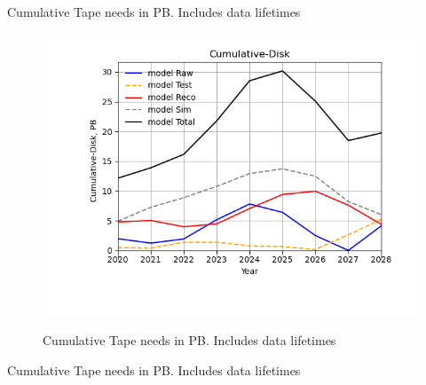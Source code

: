\documentclass[12pt,landscape]{article}
\begin{document}
\begin{table}[h]
\centering{}\label{Cumulative-Tape
}
\caption{Cumulative Tape needs in PB. Includes data lifetimes}
\end{table}
\begin{figure}[ht]
\centering\includegraphics[height=0.4\textwidth]{report/Parameters_2022-11-07-2028-Cumulative-Disk.png}\label{Cumulative-Disk}
\caption{Cumulative Tape needs in PB. Includes data lifetimes}
\end{figure}
\begin{table}[h]
\centering{}\label{Cumulative-Disk
}
\caption{Cumulative Tape needs in PB. Includes data lifetimes}
\end{table}

\end{document}
